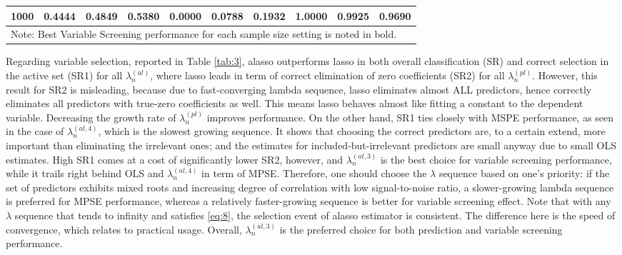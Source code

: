 \documentclass[12pt,a4paper]{article}
\begin{document}
\begin{landscape}
\begin{table}[]
\begin{tabular}{cccccccccc}
\multicolumn{1}{|c|}{1000}               & 0.4444                  & 0.4849                  & \multicolumn{1}{c|}{\textbf{0.5380}}         & 0.0000                  & 0.0788                  & \multicolumn{1}{c|}{\textbf{0.1932}}         & \textbf{1.0000}         & 0.9925                  & \multicolumn{1}{c|}{0.9690}                  \\ \hline
\multicolumn{10}{l}{Note: Best Variable Screening performance for each sample size setting is noted in bold.}                                                                                                                                                                                                                                    
\end{tabular}
\end{table}
\end{landscape}

Regarding variable selection, reported in Table \ref{tab:3}, alasso outperforms lasso in both overall classification (SR) and correct selection in the active set (SR1) for all $ \lambda_n^{(al)} $, where lasso leads in term of correct elimination of zero coefficients (SR2) for all $ \lambda_n^{(pl)} $. However, this result for SR2 is misleading, because due to fast-converging lambda sequence, lasso eliminates almost ALL predictors, hence correctly eliminates all predictors with true-zero coefficients as well. This means lasso behaves almost like fitting a constant to the dependent variable. Decreasing the growth rate of $ \lambda_n^{(pl)} $ improves performance. On the other hand, SR1 ties closely with MSPE performance, as seen in the case of $ \lambda_n^{(al, 4)} $, which is the slowest growing sequence. It shows that choosing the correct predictors are, to a certain extend, more important than eliminating the irrelevant ones; and the estimates for included-but-irrelevant predictors are small anyway due to small OLS estimates. High SR1 comes at a cost of significantly lower SR2, however, and $ \lambda_n^{(al, 3)} $ is the best choice for variable screening performance, while it trails right behind OLS and $ \lambda_n^{(al, 4)} $ in term of MPSE. Therefore, one should choose the $ \lambda $ sequence based on one's priority: if the set of predictors exhibits mixed roots and increasing degree of correlation with low signal-to-noise ratio, a slower-growing lambda sequence is preferred for MPSE performance, whereas a relatively faster-growing sequence is better for variable screening effect. Note that with any $ \lambda $ sequence that tends to infinity and satisfies \eqref{eq:8}, the selection event of alasso estimator is consistent. The difference here is the speed of convergence, which relates to practical usage. Overall, $ \lambda_n^{(al, 3)} $ is the preferred choice for both prediction and variable screening performance.
\end{document}
